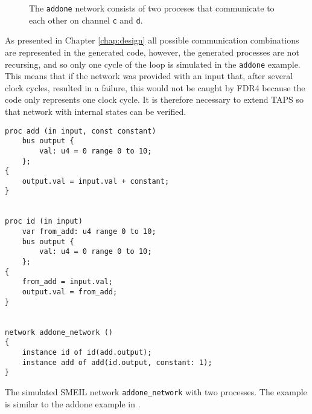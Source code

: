\begin{figure}
    \centering
    \caption{The \texttt{addone} network consists of two proceses that communicate to each other on channel \texttt{c} and \texttt{d}.}
    \label{fig:addone_unclocked}
\end{figure}
As presented in Chapter \ref{chap:design} all possible communication combinations are represented in the generated \cspm{} code, however, the generated \cspm{} processes are not recursing, and so only one cycle of the loop is simulated in the \texttt{addone} example. This means that if the network was provided with an input that, after several clock cycles, resulted in a failure, this would not be caught by FDR4 because the \cspm{} code only represents one clock cycle. It is therefore necessary to extend TAPS so that network with internal states can be verified.\\
\begin{listing}
\begin{verbatim}
proc add (in input, const constant)
    bus output {
        val: u4 = 0 range 0 to 10;
    };
{
    output.val = input.val + constant;
}


proc id (in input)
    var from_add: u4 range 0 to 10;
    bus output {
        val: u4 = 0 range 0 to 10;
    };
{
    from_add = input.val;
    output.val = from_add;
}


network addone_network ()
{
    instance id of id(add.output);
    instance add of add(id.output, constant: 1);
}
\end{verbatim}
\caption{The simulated SMEIL network \texttt{addone\_network} with two processes. The example is similar to the addone example in \cite{smeil}.}
\label{lst:addone_smeil_example}
\end{listing}

